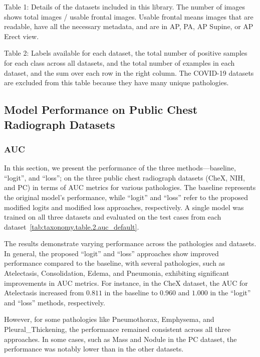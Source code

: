 Table 1: Details of the datasets included in this library. The number of images shows total images / usable frontal images. Usable frontal means images that are readable, have all the necessary metadata, and are in AP, PA, AP Supine, or AP Erect view.


Table 2: Labels available for each dataset, the total number of positive samples for each class across all datasets, and the total number of examples in each dataset, and the sum over each row in the right column. The COVID-19 datasets are excluded from this table because they have many unique pathologies.


\subsection{Model Performance on Public Chest Radiograph Datasets}

\subsubsection*{AUC}
In this section, we present the performance of the three methods—baseline, ``logit'', and ``loss''; on the three public chest radiograph datasets (CheX, NIH, and PC) in terms of AUC metrics for various pathologies. The baseline represents the original model's performance, while ``logit'' and ``loss'' refer to the proposed modified logits and modified loss approaches, respectively. A single model was trained on all three datasets and evaluated on the test cases from each dataset~\ref{tab:taxonomy.table.2.auc_default}.

The results demonstrate varying performance across the pathologies and datasets. In general, the proposed ``logit'' and ``loss'' approaches show improved performance compared to the baseline, with several pathologies, such as Atelectasis, Consolidation, Edema, and Pneumonia, exhibiting significant improvements in AUC metrics. For instance, in the CheX dataset, the AUC for Atelectasis increased from $0.811$ in the baseline to $0.960$ and $1.000$ in the ``logit'' and ``loss'' methods, respectively.

However, for some pathologies like Pneumothorax, Emphysema, and Pleural\_Thickening, the performance remained consistent across all three approaches. In some cases, such as Mass and Nodule in the PC dataset, the performance was notably lower than in the other datasets.


